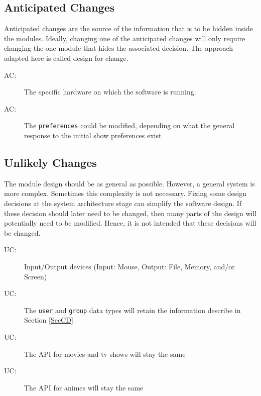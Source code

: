 \documentclass[12pt, titlepage]{article}
\newcounter{acnum}
\newcommand{\actheacnum}{AC\theacnum}
\newcounter{ucnum}
\newcommand{\uctheucnum}{UC\theucnum}
\begin{document}
\subsection{Anticipated Changes} \label{SecAchange}

Anticipated changes are the source of the information that is to be hidden
inside the modules. Ideally, changing one of the anticipated changes will only
require changing the one module that hides the associated decision. The approach
adapted here is called design for
change.

\begin{description}
\item[ \actheacnum \label{acHardware}:] The specific hardware on which the software is running.
\item[ \actheacnum \label{acPrefs}:] The \verb_preferences_ could be modified, depending on what the general response to the initial show preferences exist
\end{description}

\subsection{Unlikely Changes} \label{SecUchange}

The module design should be as general as possible. However, a general system is
more complex. Sometimes this complexity is not necessary. Fixing some design
decisions at the system architecture stage can simplify the software design. If
these decision should later need to be changed, then many parts of the design
will potentially need to be modified. Hence, it is not intended that these
decisions will be changed.

\begin{description}
\item[ \uctheucnum \label{ucIO}:] Input/Output devices (Input: Mouse, Output: File, Memory, and/or Screen)
\item[ \uctheucnum \label{ucCD}:] The \verb_user_ and \verb_group_ data types will retain the information describe in Section \ref{SecCD}
\item[ \uctheucnum \label{ucAPIMT}:] The API for movies and tv shows will stay the same
\item[ \uctheucnum \label{ucAPIA}:] The API for animes will stay the same
\end{description}
\end{document}
